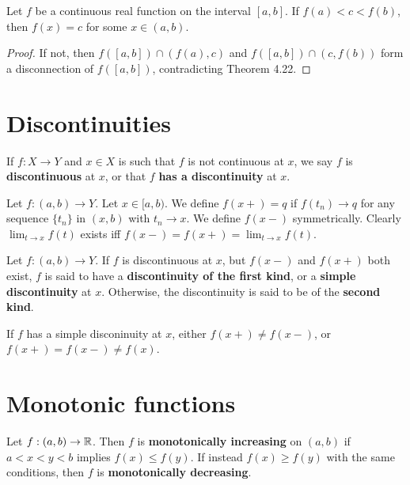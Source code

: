 \begin{theorem} %
    Let $f$ be a continuous real function on the interval $[a, b]$. If $f(a) < c < f(b)$, then $f(x) = c$ for some $x \in (a, b)$.
\begin{proof}
If not, then $f([a, b]) \cap (f(a), c)$ and $f([a, b]) \cap (c, f(b))$ form a disconnection of $f([a, b])$, contradicting Theorem 4.22.
\end{proof}
\end{theorem}

\section{Discontinuities}

\begin{definition} %
    If $f: X \to Y$ and $x \in X$ is such that $f$ is not continuous at $x$, we say $f$ is \textbf{discontinuous} at $x$, or that $f$ \textbf{has a discontinuity} at $x$.

    Let $f: (a, b) \to Y$. Let $x \in [a, b)$. We define $f(x+) = q$ if $f(t_n) \to q$ for any sequence $\{t_n\}$ in $(x, b)$ with $t_n \to x$. We define $f(x-)$ symmetrically. Clearly $\lim_{t \to x} f(t)$ exists iff $f(x-) = f(x+) = \lim_{t \to x} f(t)$. 
\end{definition}

\begin{definition} %
    Let $f: (a, b) \to Y$. If $f$ is discontinuous at $x$, but $f(x-)$ and $f(x+)$ both exist, $f$ is said to have a \textbf{discontinuity of the first kind}, or a \textbf{simple discontinuity} at $x$. Otherwise, the discontinuity is said to be of the \textbf{second kind}.

    If $f$ has a simple disconinuity at $x$, either $f(x+) \ne f(x-)$, or $f(x+) = f(x-) \ne f(x)$.
\end{definition}

\section{Monotonic functions}

\begin{definition} %
    Let $f: (a, b) \rightarrow \mathbb{R}$. Then $f$ is \textbf{monotonically increasing} on $(a, b)$ if $a < x < y < b$ implies $f(x) \le f(y)$. If instead $f(x) \ge f(y)$ with the same conditions, then $f$ is \textbf{monotonically decreasing}. 
\end{definition}

